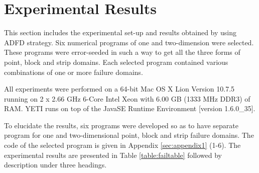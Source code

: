 \section{Experimental Results} \label{sec:experimentalResults}
This section includes the experimental set-up and results obtained by using ADFD strategy. Six numerical programs of one and two-dimension were selected. These programs were error-seeded in such a way to get all the three forms of point, block and strip domains. Each selected program contained various combinations of one or more failure domains. 

All experiments were performed on a 64-bit Mac OS X Lion Version 10.7.5 running on 2 x 2.66 GHz 6-Core Intel Xeon with 6.00 GB (1333 MHz DDR3) of RAM. YETI runs on top of the Java\texttrademark  SE Runtime Environment [version 1.6.0\_35]. 

To elucidate the results, six programs were developed so as to have separate program for one and two-dimensional point, block and strip failure domains. The code of the selected program is given in Appendix \ref{sec:appendix1} (1-6). The experimental results are presented in Table \ref{table:failtable} followed by description under three headings.

